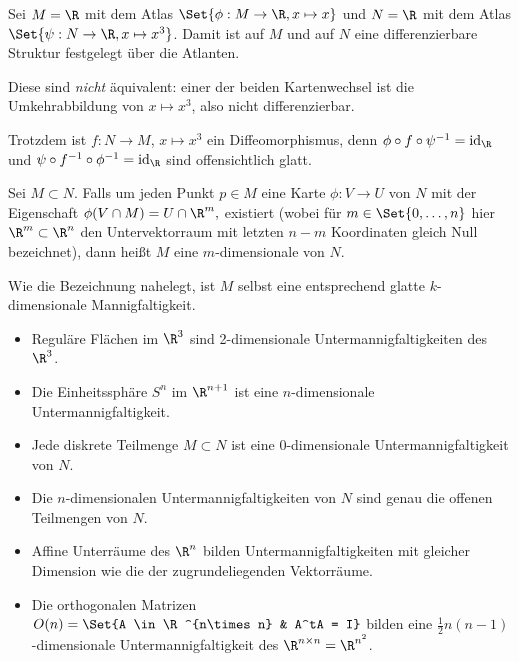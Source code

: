 \begin{ex*}
    Sei $M = \R$ mit dem Atlas $\Set{\phi: M \to \R, x \mapsto x}$ und $N = \R$ mit dem Atlas $\Set{\psi: N \to \R, x \mapsto x^3}$.
    Damit ist auf $M$ und auf $N$ eine differenzierbare Struktur festgelegt über die Atlanten.

    Diese sind \emph{nicht} äquivalent: einer der beiden Kartenwechsel ist die Umkehrabbildung von $x \mapsto x^3$, also nicht differenzierbar.

    Trotzdem ist $f: N \to M$, $x \mapsto x^3$ ein Diffeomorphismus, denn $\phi \circ f \circ \psi^{-1} = \id_\R$ und $\psi \circ f^{-1} \circ \phi^{-1} = \id_\R$ sind offensichtlich glatt.
\end{ex*}

\begin{df}[Untermannigfaltigkeit] \label{2.3}
    Sei $M \subset N$.
    Falls um jeden Punkt $p \in M$ eine Karte $\phi: V \to U$ von $N$ mit der
    Eigenschaft
    \begin{math}
        \phi(V \cap M) = U \cap \R^m,
    \end{math}
    existiert (wobei für $m \in \Set{0, \dotsc, n}$ hier $\R^m \subset \R^n$ den Untervektorraum mit letzten $n-m$ Koordinaten gleich Null bezeichnet), dann heißt $M$ eine $m$-dimensionale  von $N$.
    \begin{note}
        Wie die Bezeichnung nahelegt, ist $M$ selbst eine entsprechend glatte $k$-dimensionale Mannigfaltigkeit.
    \end{note}
\end{df}

\begin{ex*}
    \begin{itemize}
        \item
            Reguläre Flächen im $\R^3$ sind 2-dimensionale Untermannigfaltigkeiten des $\R^3$.
        \item
            Die Einheitssphäre $S^n$ im $\R^{n+1}$ ist eine $n$-dimensionale Untermannigfaltigkeit.
        \item
            Jede diskrete Teilmenge $M \subset N$ ist eine $0$-dimensionale Untermannigfaltigkeit von $N$.
        \item
            Die $n$-dimensionalen Untermannigfaltigkeiten von $N$ sind genau die offenen Teilmengen von $N$.
        \item
            Affine Unterräume des $\R^n$ bilden Untermannigfaltigkeiten mit gleicher Dimension wie die der zugrundeliegenden Vektorräume.
        \item
            Die orthogonalen Matrizen
            \begin{math}
                O(n) = \Set{A \in \R^{n\times n} & A^tA = I}
            \end{math}
            bilden eine $\frac{1}{2}n(n-1)$-dimensionale Untermannigfaltigkeit des $\R^{n\times n} = \R^{n^2}$.
    \end{itemize}
\end{ex*}

